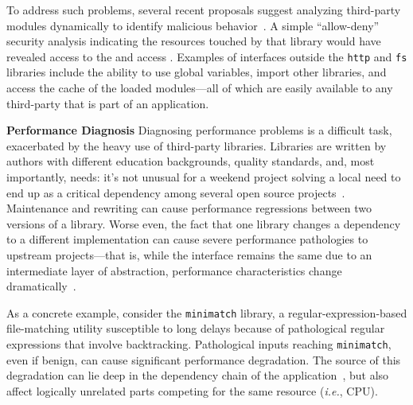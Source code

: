 \documentclass[letterpaper,twocolumn,10pt]{article}
\def\ie{{\em i.e.}, }
\newcommand{\heading}[1]{\vspace{2pt}\noindent\textbf{#1}\enspace}
\newcommand{\ttt}[1]{\texttt{#1}}
\newcommand{\fixme}[1]{{\color{red}#1}}
\begin{document}
To address such problems, several recent proposals suggest analyzing third-party modules dynamically to identify malicious behavior~\cite{}.
A simple ``allow-deny'' security analysis indicating the resources touched by that library would have revealed access to the and access .
Examples of interfaces outside the \ttt{http} and \ttt{fs} libraries include the ability to use global variables, import other libraries, and access the cache of the loaded modules---all of which are easily available to any third-party that is part of an application.


\heading{Performance Diagnosis}
Diagnosing performance problems is a difficult task, exacerbated by the heavy use of third-party libraries.
Libraries are written by authors with different education backgrounds, quality standards, and, most importantly, needs:
  it's not unusual for a weekend project solving a local need to end up as a critical dependency among several open source projects~\cite{}.
Maintenance and rewriting can cause performance regressions between two versions of a library.
Worse even, the fact that one library changes a dependency to a different implementation can cause severe performance pathologies to upstream projects---that is, while the interface remains the same due to an intermediate layer of abstraction, performance characteristics change dramatically~\cite{evhaus}.

As a concrete example, consider the \ttt{minimatch} library, a regular-expression-based file-matching utility susceptible to long delays because of pathological regular expressions that involve backtracking.
Pathological inputs reaching \ttt{minimatch}, even if benign, can cause significant performance degradation.
The source of this degradation can lie deep in the dependency chain of the application~\cite{crosby2003denial}, but also affect logically unrelated parts competing for the same resource (\ie CPU).
\end{document}
